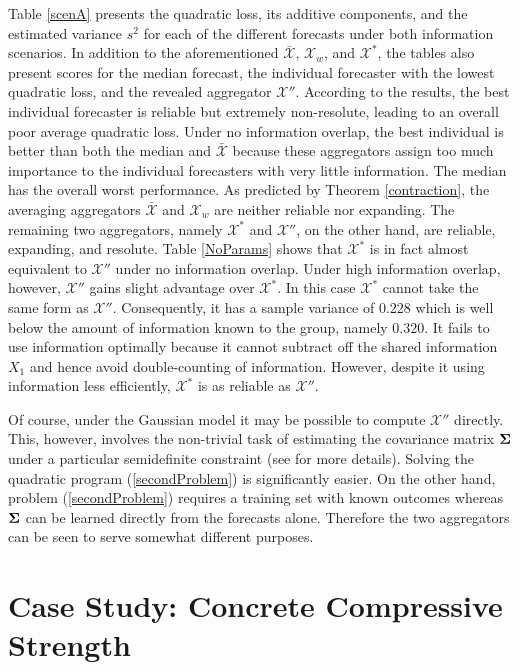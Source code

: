 \documentclass[11pt]{article}
\theoremstyle{definition}
\theoremstyle{definition}
\def\bSigma{{\bf \Sigma}}
\begin{document}
Table \ref{scenA} presents the quadratic loss, its additive components, and the estimated variance $s^2$ for each of the different forecasts under both information scenarios. In addition to the aforementioned $\bar{\mathcal{X}}$, $\mathcal{X}_w$, and $\mathcal{X}^*$, the tables also present scores for the median forecast,  the individual forecaster with the lowest quadratic loss, and the revealed aggregator $\mathcal{X}''$. According to the results, the best individual forecaster is reliable but extremely non-resolute, leading to an overall poor average quadratic loss. Under no information overlap, the best individual is better than both the median and $\bar{\mathcal{X}}$ because these aggregators assign too much importance to the individual forecasters with very little information. The median has the overall worst performance.  As predicted by Theorem \ref{contraction},  the averaging aggregators $\bar{\mathcal{X}}$ and $\mathcal{X}_w$ are neither reliable nor expanding. The remaining two aggregators, namely $\mathcal{X}^*$ and $\mathcal{X}''$, on the other hand, are reliable, expanding, and resolute. Table \ref{NoParams} shows that $\mathcal{X}^*$ is in fact  almost equivalent to $\mathcal{X}''$ under no information overlap. Under high information overlap, however, $\mathcal{X}''$ gains slight advantage over $\mathcal{X}^*$. In this case $\mathcal{X}^*$ cannot take the same form as $\mathcal{X}''$. Consequently, it has a sample variance of $0.228$ which is well below the  amount of information known to the group, namely $0.320$. It fails to use information optimally because it cannot subtract off the shared information $X_1$ and hence avoid double-counting of information. However, despite it using information less efficiently, $\mathcal{X}^*$ is as reliable as $\mathcal{X}''$. 

Of course, under the Gaussian model it may be possible to compute $\mathcal{X}''$ directly. This, however, involves the non-trivial task of estimating the covariance matrix $\bSigma$ under a particular semidefinite constraint (see \citealt{satopaamodeling2} for more details). Solving the quadratic program (\ref{secondProblem}) is significantly easier. On the other hand, problem (\ref{secondProblem}) requires a training set with known outcomes whereas $\bSigma$ can be learned directly from the forecasts alone. Therefore the two aggregators can be seen to serve somewhat different purposes. 


\section{Case Study: Concrete Compressive Strength} \label{application}
\end{document}
